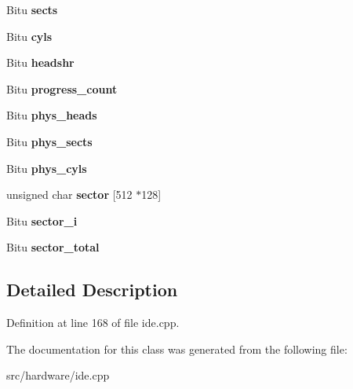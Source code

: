 \begin{DoxyCompactItemize}
\item 
\hypertarget{classIDEATADevice_a77463c48bf871a84d61a8b9bd1e95ffa}{Bitu {\bfseries sects}}\label{classIDEATADevice_a77463c48bf871a84d61a8b9bd1e95ffa}

\item 
\hypertarget{classIDEATADevice_a17435363559ff62f0d240f17f62c21cc}{Bitu {\bfseries cyls}}\label{classIDEATADevice_a17435363559ff62f0d240f17f62c21cc}

\item 
\hypertarget{classIDEATADevice_a907dbc2d9356cb6f98668573faf71242}{Bitu {\bfseries headshr}}\label{classIDEATADevice_a907dbc2d9356cb6f98668573faf71242}

\item 
\hypertarget{classIDEATADevice_a255e5d56bc9bf73d1cfdd542fd30126c}{Bitu {\bfseries progress\-\_\-count}}\label{classIDEATADevice_a255e5d56bc9bf73d1cfdd542fd30126c}

\item 
\hypertarget{classIDEATADevice_a917ccd0ef8076957499b62dd55a73377}{Bitu {\bfseries phys\-\_\-heads}}\label{classIDEATADevice_a917ccd0ef8076957499b62dd55a73377}

\item 
\hypertarget{classIDEATADevice_a15d352c5e1d3dcc12fc98b21c4ee3e40}{Bitu {\bfseries phys\-\_\-sects}}\label{classIDEATADevice_a15d352c5e1d3dcc12fc98b21c4ee3e40}

\item 
\hypertarget{classIDEATADevice_a99762c7f195dfffc524e3078b4a1e2bc}{Bitu {\bfseries phys\-\_\-cyls}}\label{classIDEATADevice_a99762c7f195dfffc524e3078b4a1e2bc}

\item 
\hypertarget{classIDEATADevice_aaf448a547054c85529e233d5381267d0}{unsigned char {\bfseries sector} \mbox{[}512 $\ast$128\mbox{]}}\label{classIDEATADevice_aaf448a547054c85529e233d5381267d0}

\item 
\hypertarget{classIDEATADevice_a28e1aaa1f0f87336ee5fe12212bdfdf1}{Bitu {\bfseries sector\-\_\-i}}\label{classIDEATADevice_a28e1aaa1f0f87336ee5fe12212bdfdf1}

\item 
\hypertarget{classIDEATADevice_a1eda9b2179b67dca4f5c850bff4a2c4c}{Bitu {\bfseries sector\-\_\-total}}\label{classIDEATADevice_a1eda9b2179b67dca4f5c850bff4a2c4c}

\end{DoxyCompactItemize}


\subsection{Detailed Description}


Definition at line 168 of file ide.\-cpp.



The documentation for this class was generated from the following file\-:\begin{DoxyCompactItemize}
\item 
src/hardware/ide.\-cpp\end{DoxyCompactItemize}

